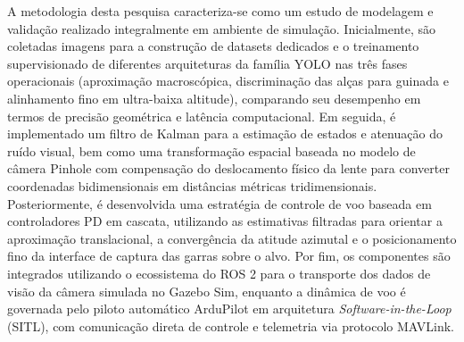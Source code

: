A metodologia desta pesquisa caracteriza-se como um estudo de modelagem e validação realizado integralmente em ambiente de simulação. Inicialmente, são coletadas imagens para a construção de datasets dedicados e o treinamento supervisionado de diferentes arquiteturas da família YOLO nas três fases operacionais (aproximação macroscópica, discriminação das alças para guinada e alinhamento fino em ultra-baixa altitude), comparando seu desempenho em termos de precisão geométrica e latência computacional. Em seguida, é implementado um filtro de Kalman para a estimação de estados e atenuação do ruído visual, bem como uma transformação espacial baseada no modelo de câmera Pinhole com compensação do deslocamento físico da lente para converter coordenadas bidimensionais em distâncias métricas tridimensionais. Posteriormente, é desenvolvida uma estratégia de controle de voo baseada em controladores PD em cascata, utilizando as estimativas filtradas para orientar a aproximação translacional, a convergência da atitude azimutal e o posicionamento fino da interface de captura das garras sobre o alvo. Por fim, os componentes são integrados utilizando o ecossistema do ROS 2 para o transporte dos dados de visão da câmera simulada no Gazebo Sim, enquanto a dinâmica de voo é governada pelo piloto automático ArduPilot em arquitetura \textit{Software-in-the-Loop} (SITL), com comunicação direta de controle e telemetria via protocolo MAVLink.